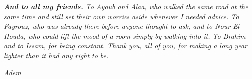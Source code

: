 \textit{\textbf{And to all my friends.} To Ayoub and Alaa, who walked the same road at the
same time and still set their own worries aside whenever I needed advice. To Fayrouz, who
was already there before anyone thought to ask, and to Nour El Houda, who could lift the
mood of a room simply by walking into it. To Brahim and to Issam, for being constant.
Thank you, all of you, for making a long year lighter than it had any right to be.}

\vspace{1.1cm}

\endgroup

\begin{flushright}
\textit{Adem}
\end{flushright}

